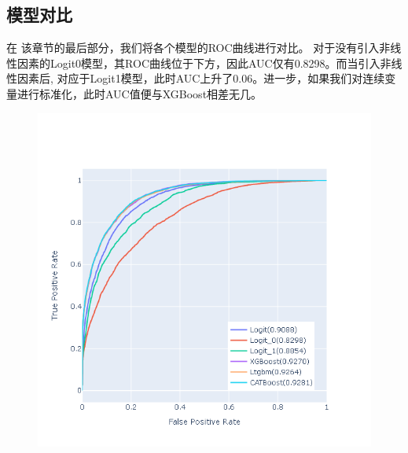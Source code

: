 \documentclass[12pt]{article}
\begin{document}
\subsection{模型对比}
在 该章节的最后部分，我们将各个模型的ROC曲线进行对比。
对于没有引入非线性因素的Logit0模型，其ROC曲线位于下方，因此AUC仅有0.8298。而当引入非线性因素后, 对应于Logit1模型，此时AUC上升了0.06。进一步，如果我们对连续变量进行标准化，此时AUC值便与XGBoost相差无几。
\\
\begin{figure}
	\vspace{0cm}
	\setlength{\abovecaptionskip}{-1cm} %
	\setlength{\belowcaptionskip}{-0.5cm} %
	\begin{center}
		\makeatletter
		\def\@captype{figure}
		\makeatother
		\includegraphics[width=5.0in]{images/newplot.png}
		\caption{}
		\label{WE}
	\end{center}
\end{figure}
\end{document}
